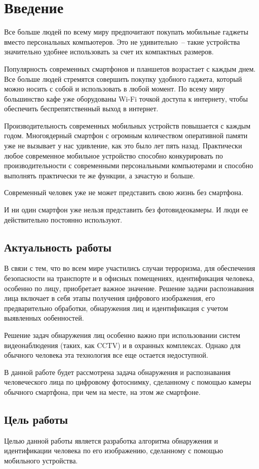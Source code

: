 \section{Введение}

Все больше людей по всему миру предпочитают покупать мобильные гаджеты
вместо персональных компьютеров. Это не удивительно~--
такие устройства значительно удобнее использовать за счет их компактных размеров.

Популярность современных смартфонов и планшетов возрастает с каждым днем.
Все больше людей стремятся совершить покупку удобного гаджета, который можно
носить с собой и использовать в любой момент.
По всему миру большинство кафе уже оборудованы Wi-Fi точкой доступа к интернету,
чтобы обеспечить беспрепятственный выход в интернет.

Производительность современных мобильных устройств повышается с каждым годом.
Многоядерный смартфон с огромным количеством оперативной памяти уже не вызывает
у нас удивление, как это было лет пять назад. Практически любое современное
мобильное устройство способно конкурировать по производительности с
современными персональными компьютерами и способно выполнять практически те же
функции, а зачастую и больше.

Современный человек уже не может представить свою жизнь без смартфона.

И ни один смартфон уже нельзя представить без фотовидеокамеры. И люди ее
действительно постоянно используют.

\subsection{Актуальность работы}

В связи с тем, что во всем мире участились случаи терроризма, для обеспечения 
безопасности на транспорте и в офисных помещениях, идентификация человека,
особенно по лицу, приобретает важное значение.
Решение задачи распознавания лица включает в себя этапы получения
цифрового изображения, его предварительно обработки, обнаружения лиц и
идентификация с учетом выявленных ообенностей.

Решение задач обнаружения лиц особенно важно при использовании систем
видеонаблюдения (таких, как CCTV) и в охранных комплексах.
Однако для обычного человека эта технология все еще остается недоступной.

В данной работе будет рассмотрена задача обнаружения и распознавания 
человеческого лица по цифровому фотоснимку, сделанному с помощью камеры
обычного смартфона, при чем на месте, на этом же смартфоне.

\subsection{Цель работы}

Целью данной работы является разработка алгоритма обнаружения и идентификации
человека по его изображению, сделанному с помощью мобильного устройства.

\clearpage
